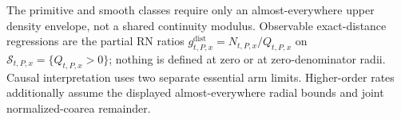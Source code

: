 The primitive and smooth classes require only an almost-everywhere upper density envelope, not a shared continuity modulus.  Observable exact-distance regressions are the partial RN ratios \(g^{\mathrm{dist}}_{t,P,x}=N_{t,P,x}/Q_{t,P,x}\) on \(\mathcal S_{t,P,x}=\{Q_{t,P,x}>0\}\); nothing is defined at zero or at zero-denominator radii.  Causal interpretation uses two separate essential arm limits.  Higher-order rates additionally assume the displayed almost-everywhere radial bounds and joint normalized-coarea remainder.